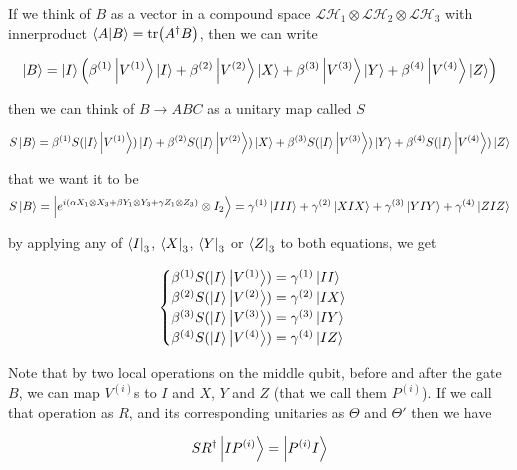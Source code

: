 \documentclass{report}
\begin{document}
If we think of $B$ as a vector in a compound space $\mathcal{LH}_1 \otimes \mathcal{LH}_2 \otimes \mathcal{LH}_3$ with innerproduct $\braket{A}{B} = \tr(A^\dagger B)$, then we can write

\begin{equation}
  \ket{B} = \ket{I} \qty(\beta^{(1)} \ket{V^{(1)}}\ket{I} + \beta^{(2)} \ket{V^{(2)}}\ket{X} + \beta^{(3)} \ket{V^{(3)}}\ket{Y} + \beta^{(4)} \ket{V^{(4)}}\ket{Z})
\end{equation}

then we can think of $B \to ABC$ as a unitary map called $S$

\begin{equation}
  S\ket{B} = \beta^{(1)} S(\ket{I}\ket{V^{(1)}})\ket{I} + \beta^{(2)} S(\ket{I}\ket{V^{(2)}})\ket{X} + \beta^{(3)} S(\ket{I}\ket{V^{(3)}})\ket{Y} + \beta^{(4)} S(\ket{I}\ket{V^{(4)}})\ket{Z}
\end{equation}

that we want it to be
\begin{equation}
  S\ket{B} = \ket{e^{i(\alpha X_1\otimes X_3 + \beta Y_1 \otimes Y_3 + \gamma Z_1 \otimes Z_3)} \otimes I_2} = \gamma^{(1)} \ket{III} + \gamma^{(2)} \ket{XIX} + \gamma^{(3)} \ket{YIY} + \gamma^{(4)} \ket{ZIZ}
\end{equation}

by applying any of $\bra{I}_3$, $\bra{X}_3$, $\bra{Y}_3$ or $\bra{Z}_3$ to both equations, we get

\begin{equation}
  \begin{cases}
    \beta^{(1)} S(\ket{I}\ket{V^{(1)}}) = \gamma^{(1)} \ket{II} \\
    \beta^{(2)} S(\ket{I}\ket{V^{(2)}}) = \gamma^{(2)} \ket{IX} \\
    \beta^{(3)} S(\ket{I}\ket{V^{(3)}}) = \gamma^{(3)} \ket{IY} \\
    \beta^{(4)} S(\ket{I}\ket{V^{(4)}}) = \gamma^{(4)} \ket{IZ}
  \end{cases}
\end{equation}

Note that by two local operations on the middle qubit, before and after the gate $B$, we can map $V^{(i)}$s to $I$ and $X$, $Y$ and $Z$ (that we call them $P^{(i)}$). If we call that operation as $R$, and its corresponding unitaries as $\Theta$ and $\Theta'$ then we have

\begin{equation}
  SR^\dagger \ket{IP^{(i)}} = \ket{P^{(i)} I}
\end{equation}
\end{document}
